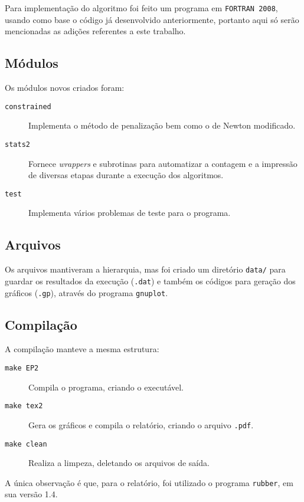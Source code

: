 Para implementação do algoritmo foi feito um programa em \texttt{FORTRAN 2008},
usando como base o código já desenvolvido anteriormente, portanto aqui só serão
mencionadas as adições referentes a este trabalho.

\subsection{Módulos}
    Os módulos novos criados foram:

    \begin{description}
        \item[\texttt{constrained}] Implementa o método de penalização bem como o de Newton modificado.
        \item[\texttt{stats2}] Fornece \emph{wrappers} e subrotinas para automatizar a contagem e a impressão de diversas etapas durante a execução dos algoritmos.
        \item[\texttt{test}]  Implementa vários problemas de teste para o programa.
    \end{description}

\subsection{Arquivos}
    Os arquivos mantiveram a hierarquia, mas foi criado um diretório \texttt{data/}
    para guardar os resultados da execução (\texttt{.dat}) e também os códigos para geração dos
    gráficos (\texttt{.gp}), através do programa \texttt{gnuplot}.

\subsection{Compilação}
    A compilação manteve a mesma estrutura:
    \begin{description}
        \item[\texttt{make EP2}] Compila o programa, criando o executável.
        \item[\texttt{make tex2}] Gera os gráficos e compila o relatório, criando o arquivo \texttt{.pdf}.
        \item[\texttt{make clean}] Realiza a limpeza, deletando os arquivos de saída.
    \end{description}

    A única observação é que, para o relatório, foi utilizado o programa \texttt{rubber},
    em sua versão 1.4.
